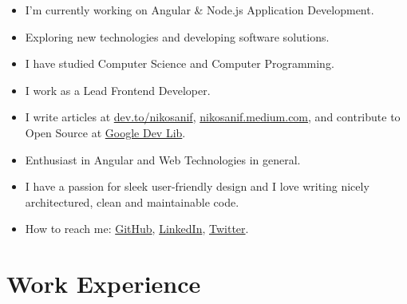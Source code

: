 \documentclass[11pt]{article}
\begin{document}
\footnotesize{
    \begin{itemize}
        \item I'm currently working on Angular \& Node.js Application Development.
        \item Exploring new technologies and developing software solutions.
        \item I have studied Computer Science and Computer Programming.
        \item I work as a Lead Frontend Developer.
        \item I write articles at 
            \href{https://dev.to/nikosanif}{dev.to/nikosanif},
            \href{https://nikosanif.medium.com/}{nikosanif.medium.com},
            and contribute to Open Source at \href{https://devlibrary.withgoogle.com/authors/nikosanif}{Google Dev Lib}.
        \item Enthusiast in Angular and Web Technologies in general.
        \item I have a passion for sleek user-friendly design and I love writing nicely architectured, clean and maintainable code.
        \item How to reach me: 
            \href{https://github.com/nikosanif}{GitHub},
            \href{https://www.linkedin.com/in/nikosanifantis/}{LinkedIn},
            \href{https://twitter.com/nikosanif}{Twitter}.
    \end{itemize}
}


\section{Work Experience}
\end{document}

